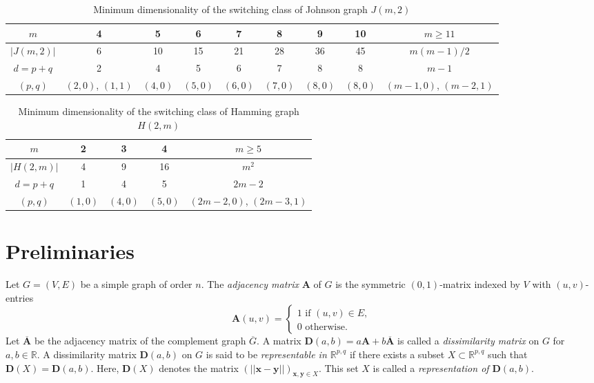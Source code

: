 \documentclass[a4paper, 11pt]{article}
\newcommand{\R}{\mathbb{R}}
\newcommand{\A}{\boldsymbol{A}}
\newcommand{\D}{\boldsymbol{D}}
\theoremstyle{definition}
\begin{document}
\begin{table}[h]
    \centering
 {\small    
\begin{tabular}{c|cccccccc}
   $m$  &   4&5&6&7&8&9&10 &$m\geq 11$  \\ \hline
   $|J(m,2)|$ &6&10&15&21&28&36&45&$m(m-1)/2$ \\
    $d=p+q$ & 2&4&5&6&7&8&8&$m-1$\\
    $(p,q)$ & $(2,0)$, $(1,1)$ &$(4,0)$&$(5,0)$&$(6,0)$&$(7,0)$&$(8,0)$&$(8,0)$&$(m-1,0)$, $(m-2,1)$
\end{tabular}
}
    \caption{Minimum dimensionality of the switching class of Johnson graph $J(m,2)$}
    \label{tab:John}
\end{table}

\begin{table}[h]
    \centering
 {\small    
\begin{tabular}{c|cccc}
   $m$  &   2&3&4& $m\geq 5$  \\ \hline
   $|H(2,m)|$ &4&9&16&$m^2$ \\
    $d=p+q$ & 1&4&5&$2m-2$\\
    $(p,q)$ & $(1,0)$ &$(4,0)$&$(5,0)$&$(2m-2,0)$, $(2m-3,1)$
\end{tabular}
}
    \caption{Minimum dimensionality of the switching class of Hamming graph $H(2,m)$}
    \label{tab:Ham}
\end{table}




\section{Preliminaries} \label{sec:2}
Let $G=(V,E)$ be a simple graph of order $n$.  
The {\it adjacency matrix} $\A$ of $G$ is the symmetric $(0,1)$-matrix indexed by $V$ with $(u,v)$-entries
\[
\A(u,v)=\begin{cases}
1 \text{ if $(u,v) \in E$},\\
0 \text{ otherwise}.
\end{cases}
\]
Let $\overline{\A}$ be the adjacency matrix of the complement graph $\overline{G}$. 
 A matrix $\D (a,b)=a \A+b \overline{\A}$ is called a {\it dissimilarity matrix} on $G$ for $a, b \in \R$.  
 A dissimilarity matrix $\D(a,b)$ on $G$ is said to be {\it representable in $\mathbb{R}^{p,q}$} if there exists a subset $X \subset \mathbb{R}^{p,q}$ such that $\D(X) = \D(a,b)$.
Here, $\D(X)$ denotes the matrix $(||\boldsymbol{x} - \boldsymbol{y}||)_{\boldsymbol{x}, \boldsymbol{y} \in X}$. 
 This set $X$ is called a {\it representation of $\D(a,b)$}. 
 
\end{document}
